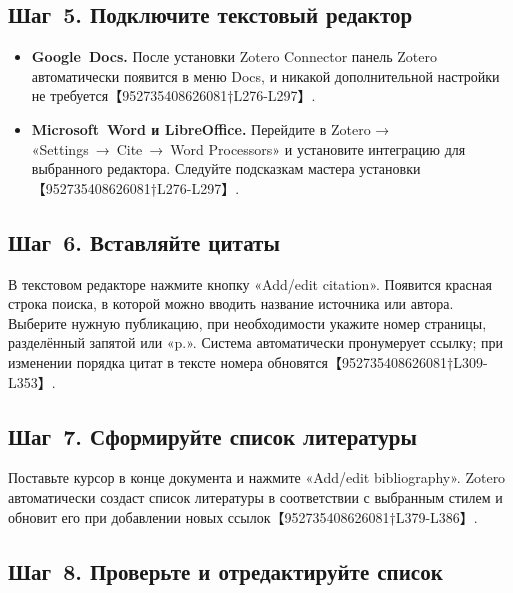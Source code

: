 \documentclass[
  russian,
  12pt,
  a4paper,
]{article}
\providecommand{\tightlist}{%
  \setlength{\itemsep}{0pt}\setlength{\parskip}{0pt}}
\begin{document}
\subsection{Шаг~5. Подключите текстовый
редактор}\label{ux448ux430ux433-5.-ux43fux43eux434ux43aux43bux44eux447ux438ux442ux435-ux442ux435ux43aux441ux442ux43eux432ux44bux439-ux440ux435ux434ux430ux43aux442ux43eux440}

\begin{itemize}
\tightlist
\item
  \textbf{Google~Docs.} После установки Zotero Connector панель Zotero
  автоматически появится в меню Docs, и никакой дополнительной настройки
  не требуется【952735408626081†L276-L297】.
\item
  \textbf{Microsoft~Word и LibreOffice.} Перейдите в Zotero →
  «Settings~→~Cite~→~Word Processors» и установите интеграцию для
  выбранного редактора. Следуйте подсказкам мастера установки
  【952735408626081†L276-L297】.
\end{itemize}

\subsection{Шаг~6. Вставляйте
цитаты}\label{ux448ux430ux433-6.-ux432ux441ux442ux430ux432ux43bux44fux439ux442ux435-ux446ux438ux442ux430ux442ux44b}

В текстовом редакторе нажмите кнопку «Add/edit citation». Появится
красная строка поиска, в которой можно вводить название источника или
автора. Выберите нужную публикацию, при необходимости укажите номер
страницы, разделённый запятой или «p.». Система автоматически
пронумерует ссылку; при изменении порядка цитат в тексте номера
обновятся【952735408626081†L309-L353】.

\subsection{Шаг~7. Сформируйте список
литературы}\label{ux448ux430ux433-7.-ux441ux444ux43eux440ux43cux438ux440ux443ux439ux442ux435-ux441ux43fux438ux441ux43eux43a-ux43bux438ux442ux435ux440ux430ux442ux443ux440ux44b}

Поставьте курсор в конце документа и нажмите «Add/edit bibliography».
Zotero автоматически создаст список литературы в соответствии с
выбранным стилем и обновит его при добавлении новых
ссылок【952735408626081†L379-L386】.

\subsection{Шаг~8. Проверьте и отредактируйте
список}\label{ux448ux430ux433-8.-ux43fux440ux43eux432ux435ux440ux44cux442ux435-ux438-ux43eux442ux440ux435ux434ux430ux43aux442ux438ux440ux443ux439ux442ux435-ux441ux43fux438ux441ux43eux43a}
\end{document}

